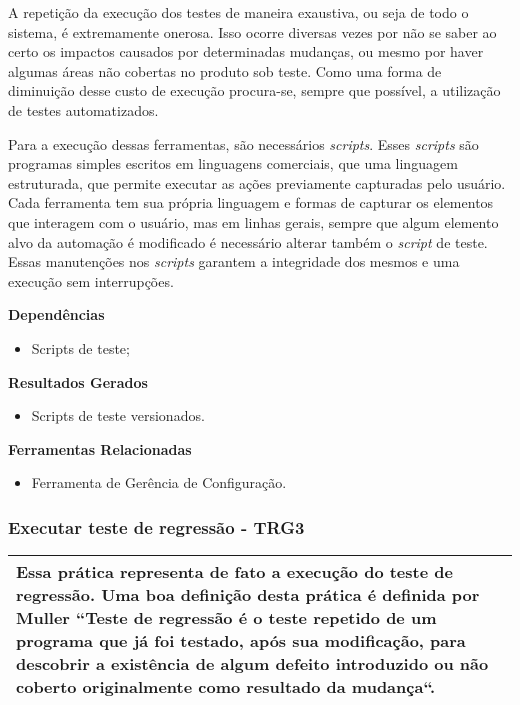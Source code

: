 A repetição da execução dos testes de maneira exaustiva, ou seja de todo o sistema, é extremamente onerosa. Isso ocorre diversas vezes por não se saber ao certo os impactos causados por determinadas mudanças, ou mesmo por haver algumas áreas não cobertas no produto sob teste. Como uma forma de diminuição desse custo de execução procura-se, sempre que possível, a utilização de testes automatizados. 

Para a execução dessas ferramentas, são necessários \textit{scripts}. Esses \textit{scripts} são programas simples escritos em linguagens comerciais, que uma linguagem estruturada, que permite executar as ações previamente capturadas pelo usuário. Cada ferramenta tem sua própria linguagem e formas de capturar os elementos que interagem com o usuário, mas em linhas gerais, sempre que algum elemento alvo da automação é modificado é necessário alterar também o \textit{script} de teste. Essas manutenções nos \textit{scripts} garantem a integridade dos mesmos e uma execução sem interrupções.

\textbf{Dependências}
\begin{itemize}
    \item Scripts de teste;
\end{itemize}

\textbf{Resultados Gerados}
\begin{itemize}
    \item Scripts de teste versionados.
\end{itemize}

\textbf{Ferramentas Relacionadas}
\begin{itemize}
    \item Ferramenta de Gerência de Configuração.
\end{itemize}

\subsubsection{Executar teste de regressão - TRG3}
\label{sec:trg3}

\begin{table}[H]
\centering
\begin{tabular}{|p{130mm}|}
\hline
Essa prática representa de fato a execução do teste de regressão. Uma boa definição desta prática é definida por Muller \cite{muller2011} “Teste de regressão é o teste repetido de um programa que já foi testado, após sua modificação, para descobrir a existência de algum defeito introduzido ou não coberto originalmente como resultado da mudança“.  \\
\hline
\end{tabular}
\end{table}

